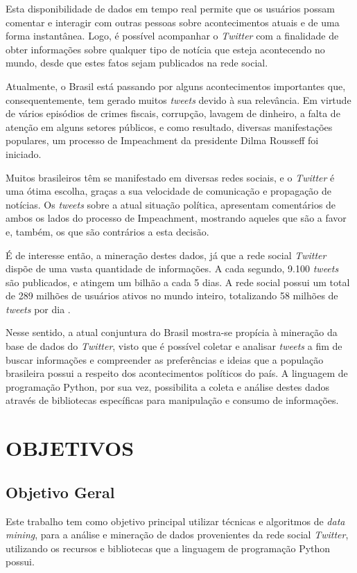 Esta disponibilidade de dados em tempo real permite que os usuários possam comentar e interagir com outras pessoas sobre acontecimentos atuais e de uma forma instantânea. Logo, é possível acompanhar o \textit{Twitter} com a finalidade de obter informações sobre qualquer tipo de notícia que esteja acontecendo no mundo, desde que estes fatos sejam publicados na rede social.

Atualmente, o Brasil está passando por alguns acontecimentos importantes que, consequentemente, tem gerado muitos \textit{tweets} devido à sua relevância. Em virtude de vários episódios de crimes fiscais, corrupção, lavagem de dinheiro, a falta de atenção em alguns setores públicos, e como resultado, diversas manifestações populares, um processo de Impeachment da presidente Dilma Rousseff foi iniciado.

Muitos brasileiros têm se manifestado em diversas redes sociais, e o \textit{Twitter} é uma ótima escolha, graças a sua velocidade de comunicação e propagação de notícias. Os \textit{tweets} sobre a atual situação política, apresentam comentários de ambos os lados do processo de Impeachment, mostrando aqueles que são a favor e, também, os que são contrários a esta decisão.

É de interesse então, a mineração destes dados, já que a rede social \textit{Twitter} dispõe de uma vasta quantidade de informações. A cada segundo, 9.100 \textit{tweets} são publicados, e atingem um bilhão a cada 5 dias. A rede social possui um total de 289 milhões de usuários ativos no mundo inteiro, totalizando 58 milhões de \textit{tweets} por dia \cite{statistics}.

Nesse sentido, a atual conjuntura do Brasil mostra-se propícia à mineração da base de dados do \textit{Twitter}, visto que é possível coletar e analisar \textit{tweets} a fim de buscar informações e compreender as preferências e ideias que a população brasileira possui a respeito dos acontecimentos políticos do país. A linguagem de programação Python, por sua vez, possibilita a coleta e análise destes dados através de bibliotecas específicas para manipulação e consumo de informações.


\section{OBJETIVOS}\label{sec:objetivos}

\subsection{Objetivo Geral} 
Este trabalho tem como objetivo principal utilizar técnicas e algoritmos de \textit{data mining}, para a análise e mineração de dados provenientes da rede social \textit{Twitter}, utilizando os recursos e bibliotecas que a linguagem de programação Python possui.

